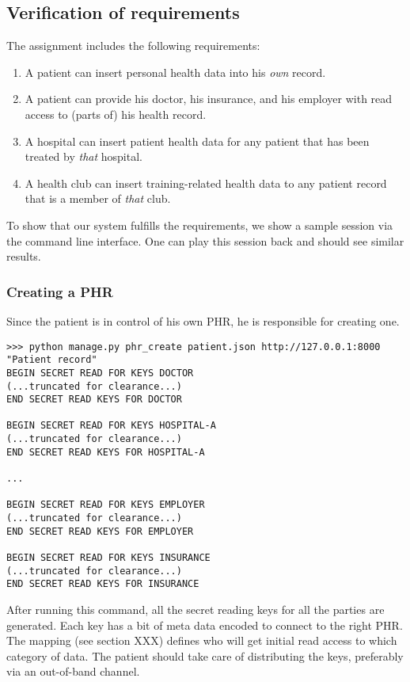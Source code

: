 \documentclass[a4paper]{article}
\begin{document}
	\subsection{Verification of requirements}
		The assignment includes the following requirements:
		
		\begin{enumerate}
			\item{A patient can insert personal health data into his \textit{own} record.}
			\item{A patient can provide his doctor, his insurance, and his employer with read access to (parts of) his health record.}
			\item{A hospital can insert patient health data for any patient that has been treated by \textit{that} hospital.}
			\item{A health club can insert training-related health data to any patient record that is a member of \textit{that} club.}
		\end{enumerate}
		
		To show that our system fulfills the requirements, we show a sample session via the command line interface. One can play this session back and should see similar results.
		
		\subsubsection{Creating a PHR}
			Since the patient is in control of his own PHR, he is responsible for creating one.
		
			\begin{lstlisting}
>>> python manage.py phr_create patient.json http://127.0.0.1:8000 "Patient record"
BEGIN SECRET READ FOR KEYS DOCTOR
(...truncated for clearance...)
END SECRET READ KEYS FOR DOCTOR

BEGIN SECRET READ FOR KEYS HOSPITAL-A
(...truncated for clearance...)
END SECRET READ KEYS FOR HOSPITAL-A

...

BEGIN SECRET READ FOR KEYS EMPLOYER
(...truncated for clearance...)
END SECRET READ KEYS FOR EMPLOYER

BEGIN SECRET READ FOR KEYS INSURANCE
(...truncated for clearance...)
END SECRET READ KEYS FOR INSURANCE
			\end{lstlisting}
		
			After running this command, all the secret reading keys for all the parties are generated. Each key has a bit of meta data encoded to connect to the right PHR. The mapping (see section XXX) defines who will get initial read access to which category of data. The patient should take care of distributing the keys, preferably via an out-of-band channel.
		
\end{document}
